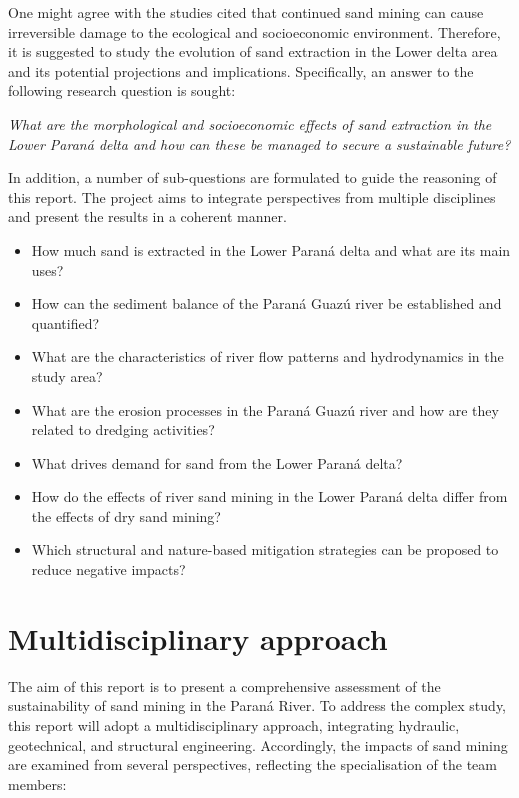 One might agree with the studies cited that continued sand mining can cause irreversible damage to the ecological and socioeconomic environment. Therefore, it is suggested to study the evolution of sand extraction in the Lower delta area and its potential projections and implications. Specifically, an answer to the following research question is sought:

\textit{What are the morphological and socioeconomic effects of sand extraction in the Lower Paraná delta and how can these be managed to secure a sustainable future?}

In addition, a number of sub-questions are formulated to guide the reasoning of this report. The project aims to integrate perspectives from multiple disciplines and present the results in a coherent manner.

\begin{itemize} 
    \item How much sand is extracted in the Lower Paraná delta and what are its main uses?
    \item How can the sediment balance of the Paraná Guazú river be established and quantified?
    \item What are the characteristics of river flow patterns and hydrodynamics in the study area?
    \item What are the erosion processes in the Paraná Guazú river and how are they related to dredging activities?
    \item What drives demand for sand from the Lower Paraná delta?
    \item How do the effects of river sand mining in the Lower Paraná delta differ from the effects of dry sand mining?
    \item Which structural and nature-based mitigation strategies can be proposed to reduce negative impacts?
\end{itemize}

\section{Multidisciplinary approach}
The aim of this report is to present a comprehensive assessment of the sustainability of sand mining in the Paraná River.
To address the complex study, this report will adopt a multidisciplinary approach, integrating hydraulic, geotechnical, and structural engineering.
Accordingly, the impacts of sand mining are examined from several perspectives, reflecting the specialisation of the team members:

